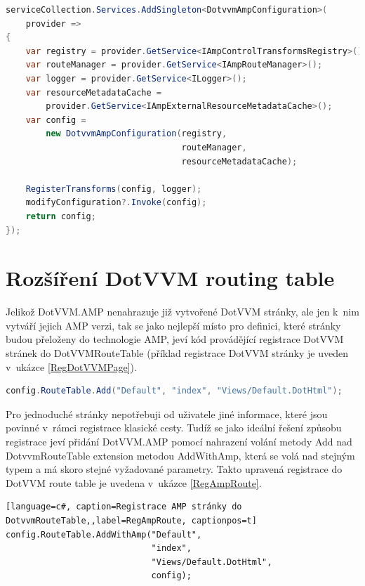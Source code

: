 \begin{lstlisting}[language=c#, caption=Registrace DotvvmAmpConfiguration,label=RegAmpConfig,captionpos=t]
serviceCollection.Services.AddSingleton<DotvvmAmpConfiguration>(
    provider =>
{
    var registry = provider.GetService<IAmpControlTransformsRegistry>();
    var routeManager = provider.GetService<IAmpRouteManager>();
    var logger = provider.GetService<ILogger>();
    var resourceMetadataCache =
        provider.GetService<IAmpExternalResourceMetadataCache>();
    var config =
        new DotvvmAmpConfiguration(registry,
                                   routeManager,
                                   resourceMetadataCache);
        
    RegisterTransforms(config, logger);
    modifyConfiguration?.Invoke(config);
    return config;
});
\end{lstlisting}
\section{Rozšíření DotVVM routing table}
Jelikož DotVVM.AMP nenahrazuje již vytvořené DotVVM stránky, ale jen k~nim vytváří jejich AMP verzi, tak se jako nejlepší místo pro definici, které stránky budou přeloženy do technologie AMP, jeví kód provádějící registrace DotVVM stránek do DotVVMRouteTable (příklad registrace DotVVM stránky je uveden v~ukázce \ref{RegDotVVMPage}).

\begin{lstlisting}[language=c#, caption=Registrace DotVVM stránky do DotvvmRouteTable,label=RegDotVVMPage,captionpos=t]
config.RouteTable.Add("Default", "index", "Views/Default.DotHtml");
\end{lstlisting}

\pagebreak
Pro jednoduché stránky nepotřebuji od uživatele jiné informace, které jsou povinné v~rámci registrace klasické cesty.
Tudíž se jako ideální řešení způsobu registrace jeví přidání DotVVM.AMP pomocí nahrazení volání metody Add nad DotvvmRouteTable extension metodou AddWithAmp, která se volá nad stejným typem a má skoro stejné vyžadované parametry. Takto upravená registrace do DotVVM route table je uvedena v~ukázce \ref{RegAmpRoute}.

\begin{lstlisting}[language=c#, caption=Registrace AMP stránky do DotvvmRouteTable,,label=RegAmpRoute, captionpos=t]
config.RouteTable.AddWithAmp("Default",
                             "index",
                             "Views/Default.DotHtml",
                             config);
\end{lstlisting}

